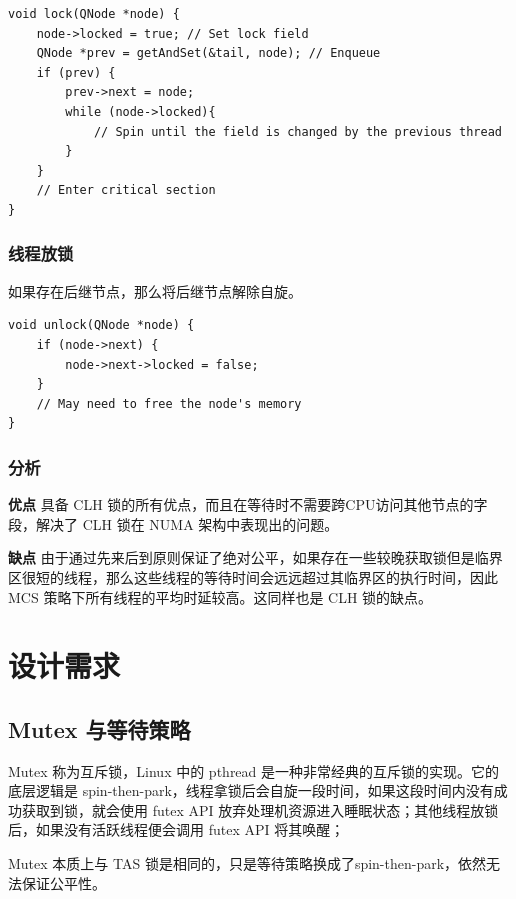 \documentclass[UTF8]{ctexart}
\begin{document}
\begin{lstlisting}
void lock(QNode *node) {
    node->locked = true; // Set lock field
    QNode *prev = getAndSet(&tail, node); // Enqueue
    if (prev) {
        prev->next = node;
        while (node->locked){
            // Spin until the field is changed by the previous thread
        }
    }
    // Enter critical section
}
\end{lstlisting}

\subsubsection{线程放锁}

如果存在后继节点，那么将后继节点解除自旋。

\begin{lstlisting}
void unlock(QNode *node) {
    if (node->next) {
        node->next->locked = false;
    }
    // May need to free the node's memory
}
\end{lstlisting}

\subsubsection{分析}

\textbf{优点} 具备 CLH 锁的所有优点，而且在等待时不需要跨CPU访问其他节点的字段，解决了 CLH 锁在 NUMA 架构中表现出的问题。

\textbf{缺点} 由于通过先来后到原则保证了绝对公平，如果存在一些较晚获取锁但是临界区很短的线程，那么这些线程的等待时间会远远超过其临界区的执行时间，因此 MCS 策略下所有线程的平均时延较高。这同样也是 CLH 锁的缺点。

\section{设计需求}

\subsection{Mutex 与等待策略}

Mutex 称为互斥锁，Linux 中的 pthread 是一种非常经典的互斥锁的实现。它的底层逻辑是 spin-then-park，线程拿锁后会自旋一段时间，如果这段时间内没有成功获取到锁，就会使用 futex API 放弃处理机资源进入睡眠状态；其他线程放锁后，如果没有活跃线程便会调用 futex API 将其唤醒；

Mutex 本质上与 TAS 锁是相同的，只是等待策略换成了spin-then-park，依然无法保证公平性。
\end{document}
